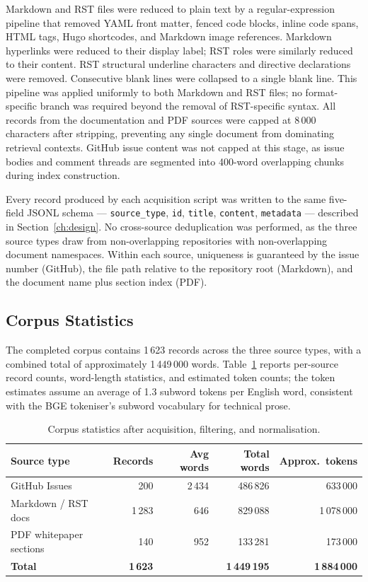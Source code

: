 Markdown and RST files were reduced to plain text by a regular-expression pipeline that removed YAML front matter, fenced code blocks, inline code spans, HTML tags, Hugo shortcodes, and Markdown image references. Markdown hyperlinks were reduced to their display label; RST roles were similarly reduced to their content. RST structural underline characters and directive declarations were removed. Consecutive blank lines were collapsed to a single blank line. This pipeline was applied uniformly to both Markdown and RST files; no format-specific branch was required beyond the removal of RST-specific syntax. All records from the documentation and PDF sources were capped at 8\,000 characters after stripping, preventing any single document from dominating retrieval contexts. GitHub issue content was not capped at this stage, as issue bodies and comment threads are segmented into 400-word overlapping chunks during index construction.

Every record produced by each acquisition script was written to the same five-field JSONL schema — \texttt{source\_type}, \texttt{id}, \texttt{title}, \texttt{content}, \texttt{metadata} — described in Section~\ref{ch:design}. No cross-source deduplication was performed, as the three source types draw from non-overlapping repositories with non-overlapping document namespaces. Within each source, uniqueness is guaranteed by the issue number (GitHub), the file path relative to the repository root (Markdown), and the document name plus section index (PDF).

\subsection{Corpus Statistics}

The completed corpus contains 1\,623 records across the three source types, with a combined total of approximately 1\,449\,000 words. Table~\ref{tab:corpus_stats} reports per-source record counts, word-length statistics, and estimated token counts; the token estimates assume an average of 1.3 subword tokens per English word, consistent with the BGE tokeniser's subword vocabulary for technical prose.

\begin{table}[ht]
\centering
\small
\setlength{\tabcolsep}{4pt}
\caption{Corpus statistics after acquisition, filtering, and normalisation.}
\label{tab:corpus_stats}
\begin{tabular}{lrrrr}
\hline
\textbf{Source type} & \textbf{Records} & \textbf{Avg words} & \textbf{Total words} & \textbf{Approx.\ tokens} \\
\hline
GitHub Issues        & 200   & 2\,434 & 486\,826   & 633\,000 \\
Markdown / RST docs  & 1\,283 & 646   & 829\,088   & 1\,078\,000 \\
PDF whitepaper sections & 140 & 952   & 133\,281   & 173\,000 \\
\hline
\textbf{Total}       & \textbf{1\,623} & & \textbf{1\,449\,195} & \textbf{1\,884\,000} \\
\hline
\end{tabular}
\end{table}

